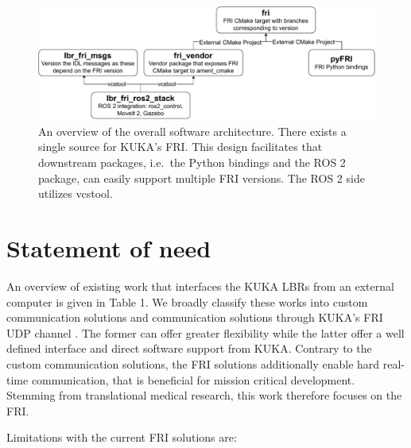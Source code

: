 \begin{figure}
\centering
\includegraphics[width=\textwidth]{appendix_a/img/fri_dependency_architecture.pdf}
\caption[An overview of the overall software architecture. There exists
a single source for KUKA's FRI. This design facilitates that downstream
packages, i.e.~the Python bindings and the ROS 2 package, can easily
support multiple FRI versions. The ROS 2 side utilizes
vcstool.\label{fig:fri}]{An overview of the overall software
architecture. There exists a single source for KUKA's FRI. This design
facilitates that downstream packages, i.e.~the Python bindings and the
ROS 2 package, can easily support multiple FRI versions. The ROS 2 side
utilizes vcstool\footnotemark{}.\label{fig:fri}}
\end{figure}

\hypertarget{statement-of-need}{%
\section{Statement of need}\label{statement-of-need}}

An overview of existing work that interfaces the KUKA LBRs from an
external computer is given in Table 1. We broadly classify these works
into custom communication solutions
\cite{ref-iiwa_stack,ref-kuka_sunrise_toolbox,ref-libiiwa} and
communication solutions through KUKA's FRI UDP channel 
\cite{ref-iiwa_ros2,ref-iiwa_ros}. The
former can offer greater flexibility while the latter offer a well
defined interface and direct software support from KUKA. Contrary to the
custom communication solutions, the FRI solutions additionally enable
hard real-time communication, that is beneficial for mission critical
development. Stemming from translational medical research, this work
therefore focuses on the FRI.

Limitations with the current FRI solutions are:

